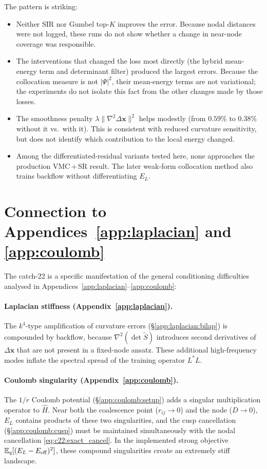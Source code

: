 The pattern is striking:
\begin{itemize}
\item Neither SIR nor Gumbel top-$K$ improves the error. Because nodal distances were
  not logged, these runs do not show whether a change in near-node coverage was responsible.
\item The interventions that changed the loss most directly (the hybrid mean-energy term
  and determinant filter) produced the largest errors. Because the collocation measure is
  not $|\Psi|^2$, their mean-energy terms are not variational; the experiments do not isolate
  this fact from the other changes made by those losses.
\item The smoothness penalty $\lambda\|\nabla^2\Delta\mathbf x\|^2$
  helps modestly (from $0.59\%$ to $0.38\%$ without it vs.\ with it).
  This is consistent with reduced curvature sensitivity, but does not identify which
  contribution to the local energy changed.
\item Among the differentiated-residual variants tested here, none approaches the
  production VMC\,+\,SR result. The later weak-form collocation method also trains
  backflow without differentiating $E_L$.
\end{itemize}


\section{Connection to Appendices~\ref{app:laplacian} and \ref{app:coulomb}}
\label{app:catch22:connection}

The catch-22 is a specific manifestation of the general conditioning
difficulties analysed in Appendices~\ref{app:laplacian}--\ref{app:coulomb}:

\paragraph{Laplacian stiffness (Appendix~\ref{app:laplacian}).}
The $k^4$-type amplification of curvature errors
(\S\ref{app:laplacian:bilap}) is compounded by backflow, because
$\nabla^2(\det\tilde S)$ introduces second derivatives of
$\Delta\mathbf x$ that are not present in a fixed-node ansatz.
These additional high-frequency modes inflate the spectral spread
of the training operator $L^\ast L$.

\paragraph{Coulomb singularity (Appendix~\ref{app:coulomb}).}
The $1/r$ Coulomb potential (\S\ref{app:coulomb:setup}) adds a
singular multiplication operator to $\hat H$.
Near both the coalescence point ($r_{ij}\to 0$) and the node
($D\to 0$), $E_L$ contains products of these two singularities,
and the cusp cancellation (\S\ref{app:coulomb:cusp}) must be
maintained simultaneously with the nodal cancellation
\eqref{eq:c22:exact_cancel}.
In the implemented strong objective
$\mathbb E_q[(E_L-E_{\rm eff})^2]$, these compound
singularities create an extremely stiff landscape.

